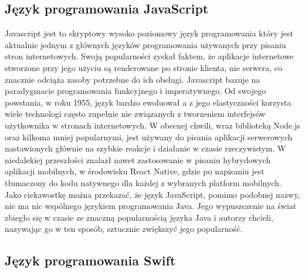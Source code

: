 \subsection{Język programowania JavaScript}

Javascript jest to skryptowy wysoko poziomowy język programowania który jest aktualnie jednym z głównych języków programowania używanych przy pisaniu stron internetowych. Swoją popularności zyskał faktem, że aplikacje internetowe stworzone przy jego użyciu są renderowane po stronie klienta, nie serwera, co znacznie odciąża zasoby potrzebne do ich obsługi. Javascript bazuje na paradygmacie programowania funkcyjnego i imperatywnego.\newline
Od swojego powstania, w roku 1955, język bardzo ewoluował a z jego elastyczności korzysta wiele technologi często zupełnie nie związanych z tworzeniem interfejsów użytkownika w stronach internetowych. W obecnej chwili, wraz biblioteką Node.js oraz kilkoma mniej popularnymi, jest używany do pisania aplikacji serwerowych nastawionych głównie na szybkie reakcje i działanie w czasie rzeczywistym. W niedalekiej przeszłości znalazł nawet zastosowanie w pisaniu hybrydowych aplikacji mobilnych, w środowisku React Native, gdzie po napisaniu jest tłumaczony do kodu natywnego dla każdej z wybranych platform mobilnych.\newline
Jako ciekawostkę można przekazać, że język JavaScript, pomimo podobnej nazwy, nie ma nic wspólnego językiem programowania Java. Jego wypuszczenie na świat zbiegło się w czasie ze znaczną popularnością języka Java i autorzy chcieli, nazywając go w ten sposób, sztucznie zwiększyć jego popularność.

\subsection{Język programowania Swift}


